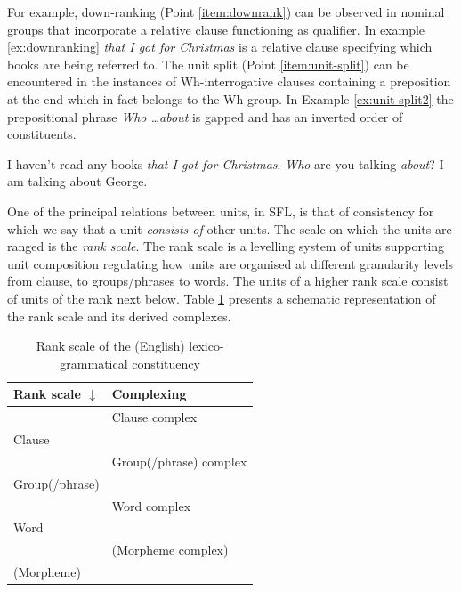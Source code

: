     For example, down-ranking (Point \ref{item:downrank}) can be observed in nominal groups that incorporate a relative clause functioning as qualifier. In example \ref{ex:downranking} \textit{that I got for Christmas} is a relative clause specifying which books are being referred to. The unit split (Point \ref{item:unit-split}) can be encountered in the instances of Wh-interrogative clauses containing a preposition at the end which in fact belongs to the Wh-group. In Example \ref{ex:unit-split2} the prepositional phrase \textit{Who \dots about} is gapped and has an inverted order of constituents. 
    
    
    \begin{exe}
    	\ex\label{ex:downranking} I haven't read any books \textit{that I got for Christmas}.
    	\ex\label{ex:unit-split2} \textit{Who} are you talking \textit{about}?
    	\ex\label{ex:unit-split1} I am talking about George.
    \end{exe}
    
    One of the principal relations between units, in SFL, is that of consistency for which we say that a unit \textit{consists of} other units. The scale on which the units are ranged is the \textit{rank scale}. The rank scale is a levelling system of units supporting unit composition regulating how units are organised at different granularity levels from clause, to groups/phrases to words. The units of a higher rank scale consist of units of the rank next below. Table \ref{tab:rank-scale} presents a schematic representation of the rank scale and its derived complexes.
    
    \begin{table}[!ht]
    	\centering
    	\begin{tabular}{|l|l|}
    		\hline
    		{\bf Rank scale $\downarrow$} & {\bf Complexing} \\ \hline
    		& Clause complex           \\ \hline
    		Clause           &                          \\ \hline
    		& Group(/phrase) complex   \\ \hline
    		Group(/phrase)   &                          \\ \hline
    		& Word complex             \\ \hline
    		Word             &                          \\ \hline
    		& (Morpheme complex)       \\ \hline
    		(Morpheme)       &                          \\ \hline
    	\end{tabular}
    	\caption{Rank scale of the (English) lexico-grammatical constituency}
    	\label{tab:rank-scale}
    \end{table}
    
